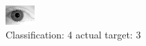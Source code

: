 \begin{figure}[h!]
\begin{center}
\includegraphics[width=0.60\columnwidth]{figures/ID2217_class_4_target_3.png}
\end{center}
\caption{ Classification: 4 actual target: 3}
\label{fig:ID2217_class_4_target_3}
\end{figure}
